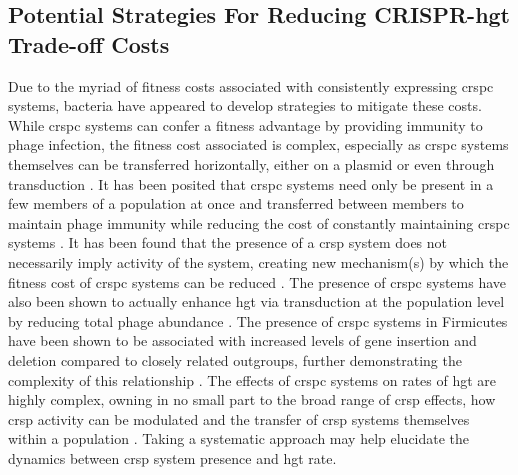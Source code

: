 \subsection*{Potential Strategies For Reducing CRISPR-\ac{hgt} Trade-off Costs}
Due to the  myriad of fitness costs associated with consistently expressing \ac{crspc} systems, bacteria have appeared to develop strategies to mitigate these costs.
While \ac{crspc} systems can confer a fitness advantage by providing immunity to phage infection, the fitness cost associated is complex, especially as \ac{crspc} systems  themselves can be transferred  horizontally, either on a plasmid or even through transduction \citep{crisprlgt}.
It has been posited that \ac{crspc} systems need only be present in a few members of a population at once and transferred between members to maintain phage immunity while reducing the cost of constantly maintaining \ac{crspc} systems \citep{acqorres}.
It has been found that the presence of a \ac{crsp} system does not necessarily imply activity of the system, creating new mechanism(s) by which the fitness cost of \ac{crspc} systems can be reduced \citep{acqorres}.
The presence of \ac{crspc} systems have also been shown to actually enhance \ac{hgt} via transduction at the population level by reducing total phage abundance \citep{transhgt}.
The presence of \ac{crspc} systems in Firmicutes have been shown to be associated with increased levels of gene insertion and deletion compared to closely related outgroups, further demonstrating the complexity of this relationship \citep{athena}.
The effects of \ac{crspc} systems on rates of \ac{hgt} are highly complex, owning in no small part to the broad range of \ac{crsp} effects, how \ac{crsp} activity can be modulated and the transfer of \ac{crsp} systems themselves within a population \citep{acqorres}.
Taking a systematic approach may help elucidate the dynamics between \ac{crsp} system presence and \ac{hgt} rate.
